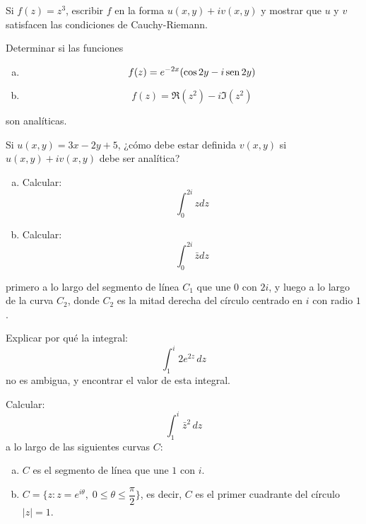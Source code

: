 \documentclass[11pt]{article}
\begin{document}
\begin{question} %
    Si $f(z) = z^3$, escribir $f$ en la forma $u(x, y) + i v(x,y)$ y mostrar que $u$ y $v$ satisfacen las condiciones de Cauchy-Riemann.
\end{question}

\begin{question} %
    Determinar si las funciones
    \begin{enumerate}[a)]
     \item \[ f(z ) = e^{-2x} (\cos 2y - i \operatorname{sen} 2y) \]
     \item \[ f(z) = \Re(z^2) - i \Im(z^2) \]
    \end{enumerate}
    son analíticas.
\end{question}

\begin{question} %
    Si $u(x, y) = 3 x - 2 y + 5$, ¿cómo debe estar definida $v(x, y)$ si $u(x, y) + i v(x, y)$ debe ser analítica?
\end{question}

\begin{question} %
    \begin{enumerate}[a)]
        \item Calcular:
        \[ \int_0^{2i} z dz \]
    \item Calcular:
        \[ \int_0^{2 i} \bar{z} dz \]
\end{enumerate}
primero a lo largo del segmento de línea $C_1$ que une $0$ con $2i$, y luego a lo largo de la curva $C_2$, donde $C_2$ es la mitad derecha del círculo centrado en $i$ con radio $1$.
\end{question}

\begin{question} %
Explicar por qué la integral:
\[ \int_1^i 2 e^{2z} \, dz \]
no es ambigua, y encontrar el valor de esta integral.
\end{question}

\begin{question}  %
    Calcular:
    \[ \int_1^i \bar{z}^2 \, dz \]
    a lo largo de las siguientes curvas $C$:
    \begin{enumerate}[a)]
        \item $C$ es el segmento de línea que une $1$ con $i$.
        \item $C = \{z : z = e^{i \theta}, \; 0 \leq \theta \leq \dfrac{\pi}{2}\} $, es decir, $C$ es el primer cuadrante del círculo $|z| = 1$.
    \end{enumerate}
\end{question}
\end{document}
